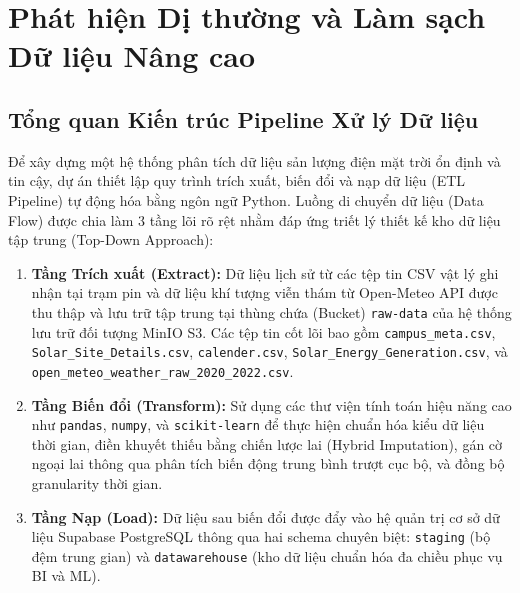 \documentclass[12pt, a4paper]{report}
\begin{document}
\chapter{Phát hiện Dị thường và Làm sạch Dữ liệu Nâng cao}
\label{chap:etl_cleaning}

\section{Tổng quan Kiến trúc Pipeline Xử lý Dữ liệu}
\label{sec:pipeline_overview}

Để xây dựng một hệ thống phân tích dữ liệu sản lượng điện mặt trời ổn định và tin cậy, dự án thiết lập quy trình trích xuất, biến đổi và nạp dữ liệu (ETL Pipeline) tự động hóa bằng ngôn ngữ Python. Luồng di chuyển dữ liệu (Data Flow) được chia làm 3 tầng lõi rõ rệt nhằm đáp ứng triết lý thiết kế kho dữ liệu tập trung (Top-Down Approach):

\begin{enumerate}[noitemsep]
    \item \textbf{Tầng Trích xuất (Extract):} Dữ liệu lịch sử từ các tệp tin CSV vật lý ghi nhận tại trạm pin và dữ liệu khí tượng viễn thám từ Open-Meteo API được thu thập và lưu trữ tập trung tại thùng chứa (Bucket) \texttt{raw-data} của hệ thống lưu trữ đối tượng MinIO S3. Các tệp tin cốt lõi bao gồm \texttt{campus\_meta.csv}, \texttt{Solar\_Site\_Details.csv}, \texttt{calender.csv}, \texttt{Solar\_Energy\_Generation.csv}, và \texttt{open\_meteo\_weather\_raw\_2020\_2022.csv}.
    \item \textbf{Tầng Biến đổi (Transform):} Sử dụng các thư viện tính toán hiệu năng cao như \texttt{pandas}, \texttt{numpy}, và \texttt{scikit-learn} để thực hiện chuẩn hóa kiểu dữ liệu thời gian, điền khuyết thiếu bằng chiến lược lai (Hybrid Imputation), gán cờ ngoại lai thông qua phân tích biến động trung bình trượt cục bộ, và đồng bộ granularity thời gian.
    \item \textbf{Tầng Nạp (Load):} Dữ liệu sau biến đổi được đẩy vào hệ quản trị cơ sở dữ liệu Supabase PostgreSQL thông qua hai schema chuyên biệt: \texttt{staging} (bộ đệm trung gian) và \texttt{datawarehouse} (kho dữ liệu chuẩn hóa đa chiều phục vụ BI và ML).
\end{enumerate}
\end{document}
